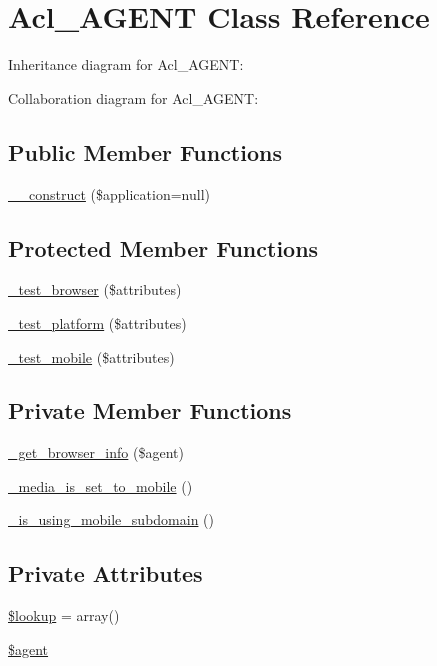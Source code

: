 \hypertarget{classAcl__AGENT}{
\section{Acl\_\-AGENT Class Reference}
\label{classAcl__AGENT}
}


Inheritance diagram for Acl\_\-AGENT:


Collaboration diagram for Acl\_\-AGENT:
\subsection*{Public Member Functions}
\begin{DoxyCompactItemize}
\item 
\hyperlink{classAcl__AGENT_a8093b0bcf6c990bf8b8383fdbbd8510b}{\_\-\_\-construct} (\$application=null)
\end{DoxyCompactItemize}
\subsection*{Protected Member Functions}
\begin{DoxyCompactItemize}
\item 
\hyperlink{classAcl__AGENT_a744cba93aa07450a5a1b740bb974eaae}{\_\-test\_\-browser} (\$attributes)
\item 
\hyperlink{classAcl__AGENT_a3de766b9265fc9ef070bc079cf234857}{\_\-test\_\-platform} (\$attributes)
\item 
\hyperlink{classAcl__AGENT_a8988f0d085007a7dec3371f76609193c}{\_\-test\_\-mobile} (\$attributes)
\end{DoxyCompactItemize}
\subsection*{Private Member Functions}
\begin{DoxyCompactItemize}
\item 
\hyperlink{classAcl__AGENT_a2256ee810dc78bda580badf1515b5cfa}{\_\-get\_\-browser\_\-info} (\$agent)
\item 
\hyperlink{classAcl__AGENT_a0be000c21c2b49adbc06a4e29bec6696}{\_\-media\_\-is\_\-set\_\-to\_\-mobile} ()
\item 
\hyperlink{classAcl__AGENT_a0eafe017ee439c1cb432024aabf14c69}{\_\-is\_\-using\_\-mobile\_\-subdomain} ()
\end{DoxyCompactItemize}
\subsection*{Private Attributes}
\begin{DoxyCompactItemize}
\item 
\hyperlink{classAcl__AGENT_abfbf677bba4b657eb5425cdc21cdfbbc}{\$lookup} = array()
\item 
\hyperlink{classAcl__AGENT_a0606e5b321c8c85527efdd1c17a9a569}{\$agent}
\end{DoxyCompactItemize}



